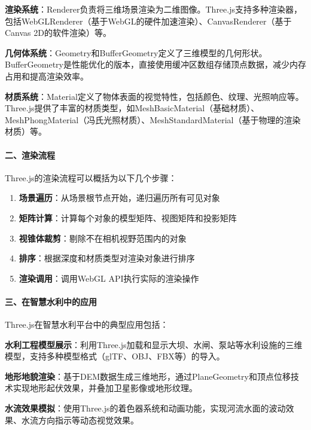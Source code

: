 \textbf{渲染系统}：Renderer负责将三维场景渲染为二维图像。Three.js支持多种渲染器，包括WebGLRenderer（基于WebGL的硬件加速渲染）、CanvasRenderer（基于Canvas
2D的软件渲染）等。

\textbf{几何体系统}：Geometry和BufferGeometry定义了三维模型的几何形状。BufferGeometry是性能优化的版本，直接使用缓冲区数组存储顶点数据，减少内存占用和提高渲染效率。

\textbf{材质系统}：Material定义了物体表面的视觉特性，包括颜色、纹理、光照响应等。Three.js提供了丰富的材质类型，如MeshBasicMaterial（基础材质）、MeshPhongMaterial（冯氏光照材质）、MeshStandardMaterial（基于物理的渲染材质）等。

\paragraph{二、渲染流程}\label{ux4e8cux6e32ux67d3ux6d41ux7a0b}

Three.js的渲染流程可以概括为以下几个步骤：

\begin{enumerate}
\def\labelenumi{\arabic{enumi}.}
\tightlist
\item
  \textbf{场景遍历}：从场景根节点开始，递归遍历所有可见对象
\item
  \textbf{矩阵计算}：计算每个对象的模型矩阵、视图矩阵和投影矩阵
\item
  \textbf{视锥体裁剪}：剔除不在相机视野范围内的对象
\item
  \textbf{排序}：根据深度和材质类型对渲染对象进行排序
\item
  \textbf{渲染调用}：调用WebGL API执行实际的渲染操作
\end{enumerate}

\paragraph{三、在智慧水利中的应用}\label{ux4e09ux5728ux667aux6167ux6c34ux5229ux4e2dux7684ux5e94ux7528}

Three.js在智慧水利平台中的典型应用包括：

\textbf{水利工程模型展示}：利用Three.js加载和显示大坝、水闸、泵站等水利设施的三维模型，支持多种模型格式（glTF、OBJ、FBX等）的导入。

\textbf{地形地貌渲染}：基于DEM数据生成三维地形，通过PlaneGeometry和顶点位移技术实现地形起伏效果，并叠加卫星影像或地形纹理。

\textbf{水流效果模拟}：使用Three.js的着色器系统和动画功能，实现河流水面的波动效果、水流方向指示等动态视觉效果。

